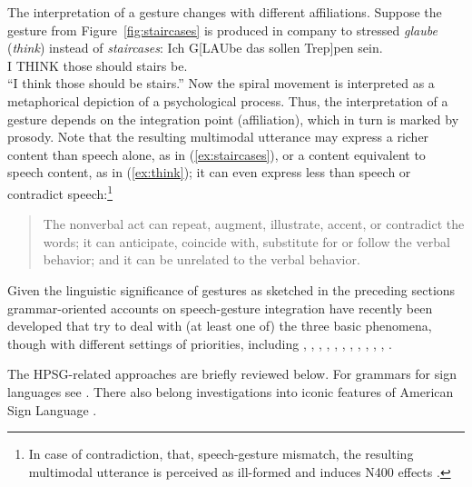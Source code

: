 \documentclass[output=paper]{langsci/langscibook}
\begin{document}
The interpretation of a gesture changes with different affiliations. 
%
Suppose the gesture from Figure~\ref{fig:staircases} is produced in company to stressed \textit{glaube} (\textit{think}) instead of \textit{staircases}: 
%
\ea \label{ex:think}
\glt Ich G[LAUbe das sollen Trep]pen sein.\\
     I THINK those should stairs be. \\
\glt \enquote{I think those should be stairs.}
\z
%
Now the spiral movement is interpreted as a metaphorical depiction of a psychological process. 
%
Thus, the interpretation of a gesture depends on the integration point (affiliation), which in turn is marked by prosody.
%
Note that the resulting multimodal utterance may express a richer content than speech alone, as in (\ref{ex:staircases}), or a content equivalent to speech content, as in (\ref{ex:think}); it can even express less than speech or contradict speech:\footnote{In case of contradiction, that, speech-gesture mismatch, the resulting multimodal utterance is perceived as ill-formed and induces N400 effects \citep{Wu:Coulson:2005,Kelly:Kravitz:Hopkins:2004}.} 
%
\begin{quote}
The nonverbal act can repeat, augment, illustrate, accent, or contradict the words; it can anticipate, coincide with, substitute for or follow the verbal behavior; and it can be unrelated to the verbal behavior.\hfill 
\citep[53]{Ekman:Friesen:1969}
\end{quote}


Given the linguistic significance of gestures as sketched in the preceding sections grammar-oriented accounts on speech-gesture integration have recently been developed that try to deal with (at least one of) the three basic phenomena, though with different settings of priorities, including
%
\citet{Alahverdzhieva:2013}, %
%
\citet{Alahverdzhieva:Lascarides:2010},
%
\cite{Ebert:2014:a},
%
\citet{Giorgolo:2010},
%
\citet{Giorgolo:Asudeh:2011},
%
\citet{Luecking:2013:a}, %
%
\citet{Luecking:2016},
%
\citet{Rieser:2008},
%
\citet{Rieser:Poesio:2009},
%
\citet{Rieser:2011},
%
\citet{Rieser:2015},
%
\citet{Schlenker:2018}.

The HPSG-related approaches are briefly reviewed below.
%
For grammars for sign languages see . 
%
There also belong investigations into iconic features of American Sign Language \citep{Schlenker:Lamberton:Santoro:2013,Schlenker:2014}.
\end{document}
